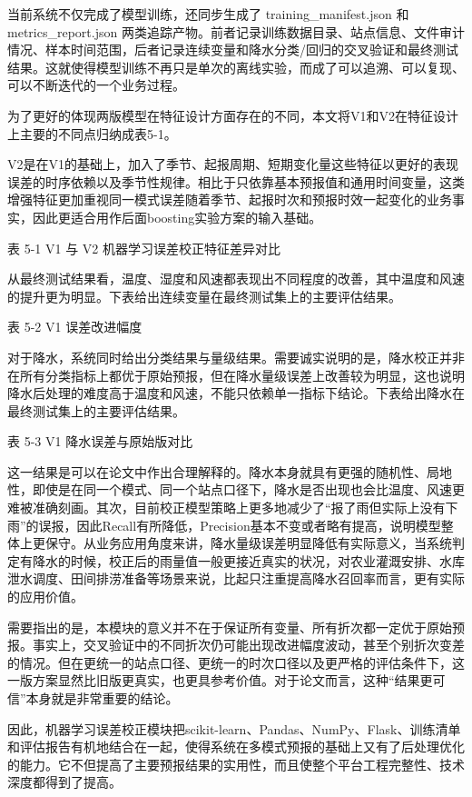 当前系统不仅完成了模型训练，还同步生成了 training\_manifest.json 和 metrics\_report.json 两类追踪产物。前者记录训练数据目录、站点信息、文件审计情况、样本时间范围，后者记录连续变量和降水分类/回归的交叉验证和最终测试结果。这就使得模型训练不再只是单次的离线实验，而成了可以追溯、可以复现、可以不断迭代的一个业务过程。

为了更好的体现两版模型在特征设计方面存在的不同，本文将V1和V2在特征设计上主要的不同点归纳成表5-1。

V2是在V1的基础上，加入了季节、起报周期、短期变化量这些特征以更好的表现误差的时序依赖以及季节性规律。相比于只依靠基本预报值和通用时间变量，这类增强特征更加重视同一模式误差随着季节、起报时次和预报时效一起变化的业务事实，因此更适合用作后面boosting实验方案的输入基础。

表 5-1  V1 与 V2 机器学习误差校正特征差异对比

从最终测试结果看，温度、湿度和风速都表现出不同程度的改善，其中温度和风速的提升更为明显。下表给出连续变量在最终测试集上的主要评估结果。

表 5-2  V1 误差改进幅度

对于降水，系统同时给出分类结果与量级结果。需要诚实说明的是，降水校正并非在所有分类指标上都优于原始预报，但在降水量级误差上改善较为明显，这也说明降水后处理的难度高于温度和风速，不能只依赖单一指标下结论。下表给出降水在最终测试集上的主要评估结果。

表 5-3  V1 降水误差与原始版对比

这一结果是可以在论文中作出合理解释的。降水本身就具有更强的随机性、局地性，即使是在同一个模式、同一个站点口径下，降水是否出现也会比温度、风速更难被准确刻画。其次，目前校正模型策略上更多地减少了“报了雨但实际上没有下雨”的误报，因此Recall有所降低，Precision基本不变或者略有提高，说明模型整体上更保守。从业务应用角度来讲，降水量级误差明显降低有实际意义，当系统判定有降水的时候，校正后的雨量值一般更接近真实的状况，对农业灌溉安排、水库泄水调度、田间排涝准备等场景来说，比起只注重提高降水召回率而言，更有实际的应用价值。

需要指出的是，本模块的意义并不在于保证所有变量、所有折次都一定优于原始预报。事实上，交叉验证中的不同折次仍可能出现改进幅度波动，甚至个别折次变差的情况。但在更统一的站点口径、更统一的时次口径以及更严格的评估条件下，这一版方案显然比旧版更真实，也更具参考价值。对于论文而言，这种“结果更可信”本身就是非常重要的结论。

因此，机器学习误差校正模块把scikit-learn、Pandas、NumPy、Flask、训练清单和评估报告有机地结合在一起，使得系统在多模式预报的基础上又有了后处理优化的能力。它不但提高了主要预报结果的实用性，而且使整个平台工程完整性、技术深度都得到了提高。

